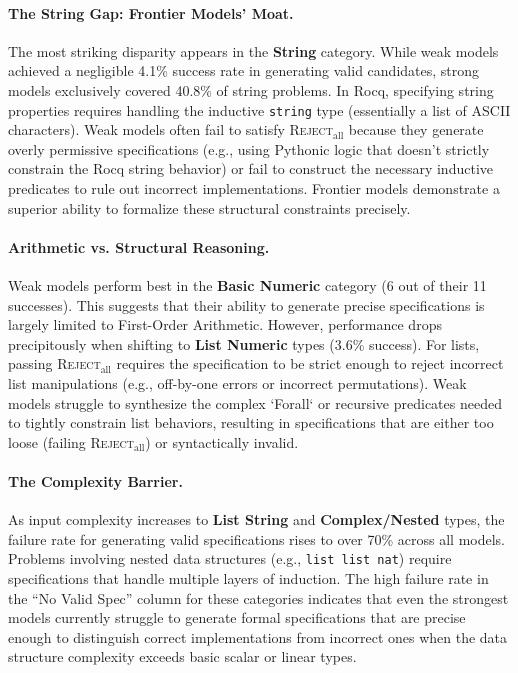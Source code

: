 \paragraph{The String Gap: Frontier Models' Moat.}
The most striking disparity appears in the \textbf{String} category. While weak models achieved a negligible 4.1\% success rate in generating valid candidates, strong models exclusively covered 40.8\% of string problems. 
In Rocq, specifying string properties requires handling the inductive \texttt{string} type (essentially a list of ASCII characters). Weak models often fail to satisfy \textsc{Reject}$_{\text{all}}$ because they generate overly permissive specifications (e.g., using Pythonic logic that doesn't strictly constrain the Rocq string behavior) or fail to construct the necessary inductive predicates to rule out incorrect implementations. Frontier models demonstrate a superior ability to formalize these structural constraints precisely.

\paragraph{Arithmetic vs. Structural Reasoning.}
Weak models perform best in the \textbf{Basic Numeric} category (6 out of their 11 successes). This suggests that their ability to generate precise specifications is largely limited to First-Order Arithmetic. However, performance drops precipitously when shifting to \textbf{List Numeric} types (3.6\% success).
For lists, passing \textsc{Reject}$_{\text{all}}$ requires the specification to be strict enough to reject incorrect list manipulations (e.g., off-by-one errors or incorrect permutations). Weak models struggle to synthesize the complex `Forall` or recursive predicates needed to tightly constrain list behaviors, resulting in specifications that are either too loose (failing \textsc{Reject}$_{\text{all}}$) or syntactically invalid.

\paragraph{The Complexity Barrier.}
As input complexity increases to \textbf{List String} and \textbf{Complex/Nested} types, the failure rate for generating valid specifications rises to over 70\% across all models. Problems involving nested data structures (e.g., \texttt{list list nat}) require specifications that handle multiple layers of induction. The high failure rate in the ``No Valid Spec'' column for these categories indicates that even the strongest models currently struggle to generate formal specifications that are precise enough to distinguish correct implementations from incorrect ones when the data structure complexity exceeds basic scalar or linear types.
